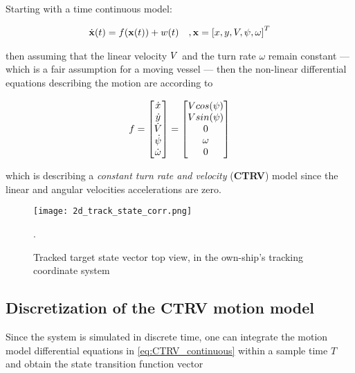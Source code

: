 Starting with a time continuous model:

\begin{equation}
\begin{aligned}\dot{\mathbf{x}}(t) = f(\mathbf{x}(t)) + w(t) &&,\mathbf{x} = \left[x,y,{V}, {\psi},\omega\right]^{T}  \end{aligned}
\end{equation}


then assuming that the linear velocity ${V}$ and the turn rate $\omega$ remain constant  --- which is a fair assumption for a moving vessel --- then the non-linear differential equations describing the motion are according to \cite{Schubert2008}

\begin{equation}\label{eq:CTRV_continuous}
f =\begin{bmatrix}\dot{x} \\ \dot{y} \\ \dot{{V}} \\ \dot{{\psi}} \\ \dot{\omega}  \end{bmatrix}=  \begin{bmatrix}{V} cos({\psi}) \\ {V} sin({\psi}) \\ 0 \\ \omega \\ 0  \end{bmatrix}
\end{equation}

which is describing a \emph{constant turn rate and velocity} (\textbf{CTRV}) model since the linear and angular velocities accelerations are zero.

\begin{figure}[H]
	\centering
	\texttt{[image: 2d\_track\_state\_corr.png]}
	\caption{Tracked target state vector top view, in the own-ship's tracking coordinate system}.
	\label{fig:state_vector}
\end{figure}

\subsection{Discretization of the CTRV motion model}

Since the system is simulated in discrete time, one can integrate the motion model differential equations in \cref{eq:CTRV_continuous} within a sample time $T$ and obtain the state transition function vector


